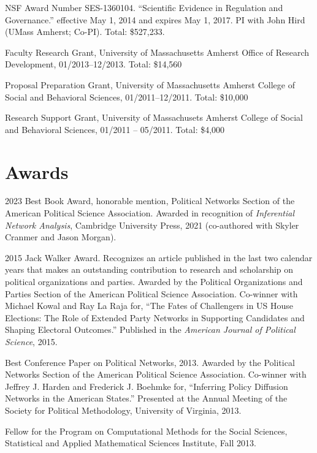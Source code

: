 \documentclass[overlapped,line]{res}
\begin{document}
\begin{resume}
\begin{etaremune}
  \item NSF Award Number SES-1360104. ``Scientific Evidence in Regulation and Governance.'' effective May 1, 2014 and expires May 1, 2017.  PI with John Hird (UMass Amherst; Co-PI). Total: \$527,233.
\item Faculty Research Grant, University of Massachusetts Amherst Office of Research Development, 01/2013--12/2013. Total: \$14,560 
 \item Proposal Preparation Grant, University of Massachusetts Amherst College of Social and Behavioral Sciences, 01/2011--12/2011. Total:  \$10,000
 \item Research Support Grant, University of Massachusets Amherst College of Social and Behavioral Sciences, 01/2011 -- 05/2011. Total: \$4,000
\end{etaremune}

\section{\bf Awards}
\begin{etaremune}
\item 2023 Best Book Award, honorable mention, Political Networks Section of the American Political Science Association. Awarded in recognition of {\em Inferential Network Analysis}, Cambridge University Press, 2021 (co-authored with Skyler Cranmer and Jason Morgan). 
\item 2015 Jack Walker Award. Recognizes an article published in the last two calendar years that makes an outstanding contribution to research and scholarship on political organizations and parties. Awarded by the Political Organizations and Parties Section of the American Political Science Association. Co-winner with Michael Kowal and Ray La Raja for, ``The Fates of Challengers in US House Elections: The Role of Extended Party Networks in Supporting Candidates and Shaping Electoral Outcomes.''  Published in the {\em American Journal of Political Science}, 2015.
\item Best Conference Paper on Political Networks, 2013. Awarded by the Political Networks Section of the American Political Science Association. Co-winner with Jeffrey J. Harden and Frederick J. Boehmke for, ``Inferring Policy Diffusion Networks in the American States.''  Presented at the Annual Meeting of the Society for Political Methodology, University of Virginia, 2013.
\item Fellow for the Program on Computational Methods for the Social Sciences, Statistical and Applied Mathematical Sciences Institute, Fall 2013.
\end{etaremune}


\end{resume}
\end{document}
